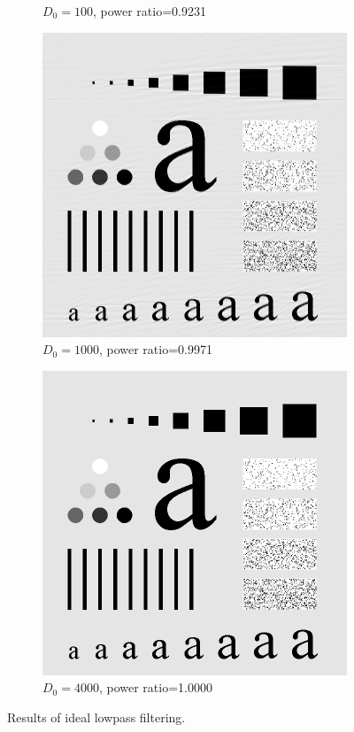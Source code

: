 \begin{figure}[h!]
\begin{subfigure}[b]{0.45\linewidth}
		\caption{$D_0=100$, power ratio=0.9231}
		\label{fig:ILPF_100}
	\end{subfigure}
	\begin{subfigure}[b]{0.45\linewidth}
		\includegraphics[width=\linewidth]{myfigure/p3/ILPF_1000.png}
		\caption{$D_0=1000$, power ratio=0.9971}
		\label{fig:ILPF_1000}
	\end{subfigure}
  	\begin{subfigure}[b]{0.45\linewidth}
		\includegraphics[width=\linewidth]{myfigure/p3/ILPF_4000.png}
		\caption{$D_0=4000$, power ratio=1.0000}
		\label{fig:ILPF_4000}
	\end{subfigure}
  	\caption{Results of ideal lowpass filtering.}
  	\label{fig:ILPF}
\end{figure}

